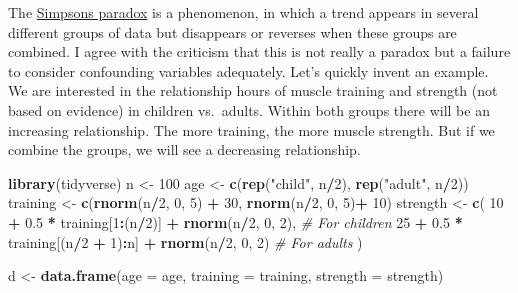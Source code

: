 \documentclass[
]{book}
\newenvironment{Shaded}{\begin{snugshade}}{\end{snugshade}}
\newcommand{\AttributeTok}[1]{\textcolor[rgb]{0.13,0.29,0.53}{#1}}
\newcommand{\CommentTok}[1]{\textcolor[rgb]{0.56,0.35,0.01}{\textit{#1}}}
\newcommand{\DecValTok}[1]{\textcolor[rgb]{0.00,0.00,0.81}{#1}}
\newcommand{\FloatTok}[1]{\textcolor[rgb]{0.00,0.00,0.81}{#1}}
\newcommand{\FunctionTok}[1]{\textcolor[rgb]{0.13,0.29,0.53}{\textbf{#1}}}
\newcommand{\NormalTok}[1]{#1}
\newcommand{\OtherTok}[1]{\textcolor[rgb]{0.56,0.35,0.01}{#1}}
\newcommand{\SpecialCharTok}[1]{\textcolor[rgb]{0.81,0.36,0.00}{\textbf{#1}}}
\newcommand{\StringTok}[1]{\textcolor[rgb]{0.31,0.60,0.02}{#1}}
\begin{document}
The \href{https://en.wikipedia.org/wiki/Simpson\%27s_paradox}{Simpsons paradox} is a phenomenon,
in which a trend appears in several different groups of data but disappears
or reverses when these groups are combined. I agree with the criticism that this is not really
a paradox but a failure to consider confounding variables adequately. Let's quickly invent an example.
We are interested in the relationship hours of muscle training and strength (not based on evidence)
in children vs.~adults. Within both groups there will be an increasing relationship. The more training,
the more muscle strength. But if we combine the groups, we will see a decreasing relationship.

\begin{Shaded}
\begin{Highlighting}[]
\FunctionTok{library}\NormalTok{(tidyverse)}
\NormalTok{n }\OtherTok{\textless{}{-}} \DecValTok{100}
\NormalTok{age }\OtherTok{\textless{}{-}} \FunctionTok{c}\NormalTok{(}\FunctionTok{rep}\NormalTok{(}\StringTok{"child"}\NormalTok{, n}\SpecialCharTok{/}\DecValTok{2}\NormalTok{), }\FunctionTok{rep}\NormalTok{(}\StringTok{"adult"}\NormalTok{, n}\SpecialCharTok{/}\DecValTok{2}\NormalTok{))}
\NormalTok{training }\OtherTok{\textless{}{-}} \FunctionTok{c}\NormalTok{(}\FunctionTok{rnorm}\NormalTok{(n}\SpecialCharTok{/}\DecValTok{2}\NormalTok{, }\DecValTok{0}\NormalTok{, }\DecValTok{5}\NormalTok{) }\SpecialCharTok{+} \DecValTok{30}\NormalTok{, }\FunctionTok{rnorm}\NormalTok{(n}\SpecialCharTok{/}\DecValTok{2}\NormalTok{, }\DecValTok{0}\NormalTok{, }\DecValTok{5}\NormalTok{)}\SpecialCharTok{+} \DecValTok{10}\NormalTok{)}
\NormalTok{strength }\OtherTok{\textless{}{-}} \FunctionTok{c}\NormalTok{(}
  \DecValTok{10} \SpecialCharTok{+} \FloatTok{0.5} \SpecialCharTok{*}\NormalTok{ training[}\DecValTok{1}\SpecialCharTok{:}\NormalTok{(n}\SpecialCharTok{/}\DecValTok{2}\NormalTok{)] }\SpecialCharTok{+} \FunctionTok{rnorm}\NormalTok{(n}\SpecialCharTok{/}\DecValTok{2}\NormalTok{, }\DecValTok{0}\NormalTok{, }\DecValTok{2}\NormalTok{), }\CommentTok{\# For children}
  \DecValTok{25} \SpecialCharTok{+} \FloatTok{0.5} \SpecialCharTok{*}\NormalTok{ training[(n}\SpecialCharTok{/}\DecValTok{2} \SpecialCharTok{+} \DecValTok{1}\NormalTok{)}\SpecialCharTok{:}\NormalTok{n] }\SpecialCharTok{+} \FunctionTok{rnorm}\NormalTok{(n}\SpecialCharTok{/}\DecValTok{2}\NormalTok{, }\DecValTok{0}\NormalTok{, }\DecValTok{2}\NormalTok{) }\CommentTok{\# For adults}
\NormalTok{)}

\NormalTok{d }\OtherTok{\textless{}{-}} \FunctionTok{data.frame}\NormalTok{(}\AttributeTok{age =}\NormalTok{ age, }\AttributeTok{training =}\NormalTok{ training, }\AttributeTok{strength =}\NormalTok{ strength)}


\end{Highlighting}
\end{Shaded}
\end{document}
